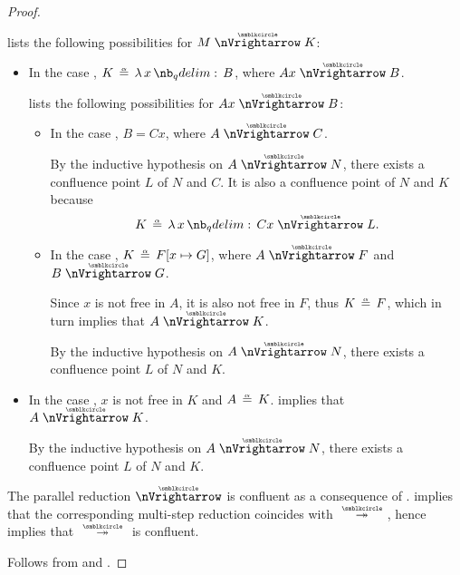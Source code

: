 \begin{proof}
\begin{itemize}
     lists the following possibilities for \( M \ppred K \):
    \begin{itemize}
      \item In the case , \( K \aequiv \qabs x B \), where \( Ax \ppred B \).

       lists the following possibilities for \( Ax \ppred B \):
      \begin{itemize}
        \item In the case , \( B = Cx \), where \( A \ppred C \).

        By the inductive hypothesis on \( A \ppred N \), there exists a confluence point \( L \) of \( N \) and \( C \). It is also a confluence point of \( N \) and \( K \) because
        \begin{equation*}
          K \aequiv \qabs x Cx \ppred L.
        \end{equation*}

        \item In the case , \( K \aequiv F[x \mapsto G] \), where \( A \ppred F \) and \( B \ppred G \).

        Since \( x \) is not free in \( A \), it is also not free in \( F \), thus \( K \aequiv F \), which in turn implies that \( A \ppred K \).

        By the inductive hypothesis on \( A \ppred N \), there exists a confluence point \( L \) of \( N \) and \( K \).
      \end{itemize}

      \item In the case , \( x \) is not free in \( K \) and \( A \aequiv K \).  implies that \( A \ppred K \).

      By the inductive hypothesis on \( A \ppred N \), there exists a confluence point \( L \) of \( N \) and \( K \).
    \end{itemize}
  \end{itemize}

   The parallel reduction \( {\ppred} \) is confluent as a consequence of .  implies that the corresponding multi-step reduction coincides with \( {\pred*} \), hence  implies that \( {\pred*} \) is confluent.

   Follows from  and .
\end{proof}
